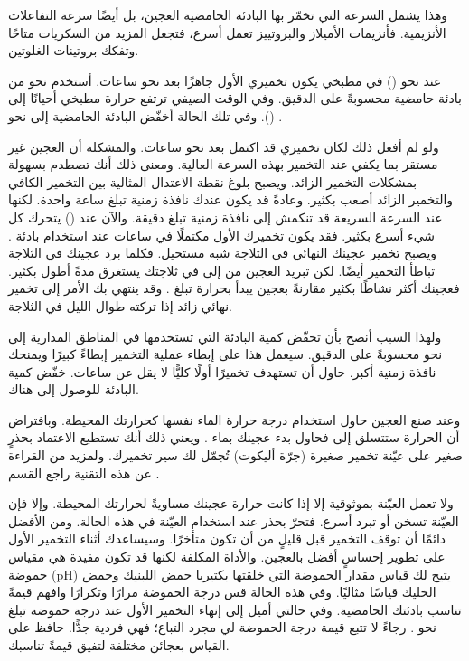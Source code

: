 وهذا يشمل السرعة التي تخمّر بها البادئة الحامضية العجين، بل أيضًا سرعة التفاعلات الأنزيمية. فأنزيمات الأميلاز والبروتييز تعمل أسرع، فتجعل المزيد من السكريات متاحًا وتفكك بروتينات الغلوتين.

عند نحو  () في مطبخي يكون تخميري الأول جاهزًا بعد نحو  ساعات. أستخدم نحو  من بادئة حامضية محسوبةً على الدقيق. وفي الوقت الصيفي ترتفع حرارة مطبخي أحيانًا إلى  (). وفي تلك الحالة أخفّض البادئة الحامضية إلى نحو .

ولو لم أفعل ذلك لكان تخميري قد اكتمل بعد نحو  ساعات. والمشكلة أن العجين غير مستقر بما يكفي عند التخمير بهذه السرعة العالية. ومعنى ذلك أنك تصطدم بسهولة بمشكلات التخمير الزائد. ويصبح بلوغ نقطة الاعتدال المثالية بين التخمير الكافي والتخمير الزائد أصعب بكثير. وعادةً قد يكون عندك نافذة زمنية تبلغ ساعة واحدة. لكنها عند السرعة السريعة قد تنكمش إلى نافذة زمنية تبلغ  دقيقة. والآن عند  () يتحرك كل شيء أسرع بكثير. فقد يكون تخميرك الأول مكتملًا في  ساعات عند استخدام بادئة . ويصبح تخمير عجينك النهائي في الثلاجة شبه مستحيل. فكلما برد عجينك في الثلاجة تباطأ التخمير أيضًا. لكن تبريد العجين من  إلى  في ثلاجتك يستغرق مدةً أطول بكثير. فعجينك أكثر نشاطًا بكثير مقارنةً بعجين يبدأ بحرارة تبلغ . وقد ينتهي بك الأمر إلى تخمير نهائي زائد إذا تركته طوال الليل في الثلاجة.

ولهذا السبب أنصح بأن تخفّض كمية البادئة التي تستخدمها في المناطق المدارية إلى نحو  محسوبةً على الدقيق. سيعمل هذا على إبطاء عملية التخمير إبطاءً كبيرًا ويمنحك نافذة زمنية أكبر. حاول أن تستهدف تخميرًا أولًا كليًّا لا يقل عن  ساعات. خفّض كمية البادئة للوصول إلى هناك.

وعند صنع العجين حاول استخدام درجة حرارة الماء نفسها كحرارتك المحيطة. وبافتراض أن الحرارة ستتسلق إلى  فحاول بدء عجينك بماء . ويعني ذلك أنك تستطيع الاعتماد بحذرٍ صغير على عيّنة تخمير صغيرة (جرّة أليكوت) تُجمّل لك سير تخميرك. ولمزيد من القراءة عن هذه التقنية راجع القسم .

ولا تعمل العيّنة بموثوقية إلا إذا كانت حرارة عجينك مساويةً لحرارتك المحيطة. وإلا فإن العيّنة تسخن أو تبرد أسرع. فتحرّ بحذر عند استخدام العيّنة في هذه الحالة. ومن الأفضل دائمًا أن توقف التخمير قبل قليلٍ من أن تكون متأخرًا. وسيساعدك أثناء التخمير الأول على تطوير إحساسٍ أفضل بالعجين. والأداة المكلفة لكنها قد تكون مفيدة هي مقياس حموضة \textenglish{(pH)} يتيح لك قياس مقدار الحموضة التي خلقتها بكتيريا حمض اللبنيك وحمض الخليك قياسًا مثاليًا. وفي هذه الحالة قس درجة الحموضة مرارًا وتكرارًا وافهم قيمةً تناسب بادئتك الحامضية. وفي حالتي أميل إلى إنهاء التخمير الأول عند درجة حموضة تبلغ نحو . رجاءً لا تتبع قيمة درجة الحموضة لي مجرد التباع؛ فهي فردية جدًّا. حافظ على القياس بعجائن مختلفة لتفيق قيمةً تناسبك.

